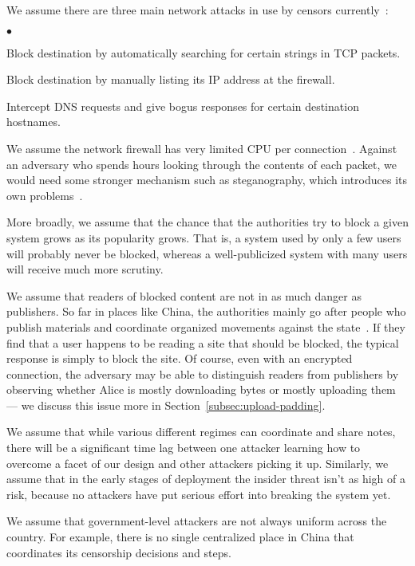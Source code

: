 \documentclass{llncs}
\newenvironment{tightlist}{\begin{list}{$\bullet$}{
  \setlength{\itemsep}{0mm}
    \setlength{\parsep}{0mm}
    }}{\end{list}}
\begin{document}
We assume there are three main network attacks in use by censors
currently~\cite{clayton:pet2006}:

\begin{tightlist}
\item Block destination by automatically searching for certain strings
in TCP packets.
\item Block destination by manually listing its IP address at the
firewall.
\item Intercept DNS requests and give bogus responses for certain
destination hostnames.
\end{tightlist}

We assume the network firewall has very limited CPU per
connection~\cite{clayton:pet2006}. Against an adversary who spends
hours looking through the contents of each packet, we would need
some stronger mechanism such as steganography, which introduces its
own problems~\cite{active-wardens,tcpstego,bar}.

More broadly, we assume that the chance that the authorities try to
block a given system grows as its popularity grows. That is, a system
used by only a few users will probably never be blocked, whereas a
well-publicized system with many users will receive much more scrutiny.

We assume that readers of blocked content are not in as much danger
as publishers. So far in places like China, the authorities mainly go
after people who publish materials and coordinate organized movements
against the state~\cite{mackinnon}. If they find that a user happens
to be reading a site that should be blocked, the typical response is
simply to block the site. Of course, even with an encrypted connection,
the adversary may be able to distinguish readers from publishers by
observing whether Alice is mostly downloading bytes or mostly uploading
them --- we discuss this issue more in Section~\ref{subsec:upload-padding}.

We assume that while various different regimes can coordinate and share
notes, there will be a significant time lag between one attacker learning
how to overcome a facet of our design and other attackers picking it up.
Similarly, we assume that in the early stages of deployment the insider
threat isn't as high of a risk, because no attackers have put serious
effort into breaking the system yet.

We assume that government-level attackers are not always uniform across
the country. For example, there is no single centralized place in China
that coordinates its censorship decisions and steps.
\end{document}

